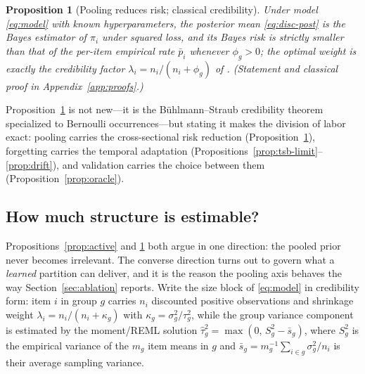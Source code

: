\documentclass[twocolumn,10pt]{article}
\newtheorem{proposition}{Proposition}
\begin{document}
\begin{proposition}[Pooling reduces risk; classical credibility]
\label{prop:credibility}
Under model \eqref{eq:model} with known hyperparameters, the posterior
mean \eqref{eq:disc-post} is the Bayes estimator of $\pi_i$ under
squared loss, and its Bayes risk is strictly smaller than that of the
per-item empirical rate $\bar p_i$ whenever $\phi_g>0$; the optimal
weight is exactly the credibility factor
$\lambda_i=n_i/(n_i+\phi_g)$ of \citet{buhlmann1967}. (Statement and
classical proof in Appendix~\ref{app:proofs}.)
\end{proposition}

Proposition~\ref{prop:credibility} is not new---it is the
B\"uhlmann--Straub credibility theorem specialized to Bernoulli
occurrences---but stating it makes the division of labor exact: pooling
carries the cross-sectional risk reduction
(Proposition~\ref{prop:credibility}), forgetting carries the temporal
adaptation (Propositions~\ref{prop:tsb-limit}--\ref{prop:drift}), and
validation carries the choice between them
(Proposition~\ref{prop:oracle}).

\subsection{How much structure is estimable?}\label{sec:resolution}

Propositions~\ref{prop:active} and \ref{prop:credibility} both argue in
one direction: the pooled prior never becomes irrelevant. The converse
direction turns out to govern what a \emph{learned} partition can
deliver, and it is the reason the pooling axis behaves the way
Section~\ref{sec:ablation} reports. Write the size block of
\eqref{eq:model} in credibility form: item $i$ in group $g$ carries
$n_i$ discounted positive observations and shrinkage weight
$\lambda_i=n_i/(n_i+\kappa_g)$ with $\kappa_g=\sigma_g^2/\tau_g^2$,
while the group variance component is estimated by the
moment/REML solution $\hat\tau_g^2=\max(0,\,S_g^2-\bar s_g)$, where
$S_g^2$ is the empirical variance of the $m_g$ item means in $g$ and
$\bar s_g=m_g^{-1}\sum_{i\in g}\sigma_g^2/n_i$ is their average
sampling variance.
\end{document}
